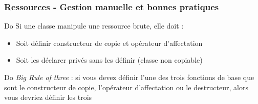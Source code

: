 \documentclass[C++.tex]{subfiles}
\begin{document}
\begin{frame}
	\frametitle{Ressources - Gestion manuelle et bonnes pratiques}
	\begin{exampleblock}{Do}
		Si une classe manipule une ressource brute, elle doit :
		\begin{itemize}
			\item Soit définir constructeur de copie et opérateur d'affectation
			\item Soit les déclarer privés sans les définir (classe non copiable)
		\end{itemize}
	\end{exampleblock}

	\begin{exampleblock}{Do}
		\textit{Big Rule of three} : si vous devez définir l'une des trois fonctions de base que sont le constructeur de copie, l'opérateur d'affectation ou le destructeur, alors vous devriez définir les trois


	\end{exampleblock}

\end{frame}
\end{document}
